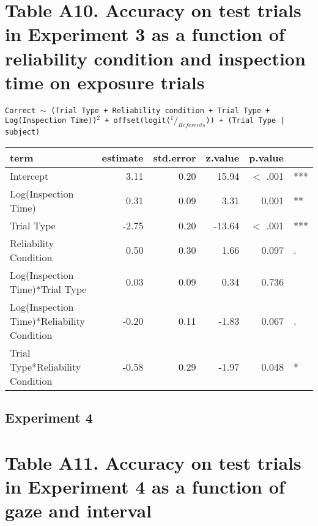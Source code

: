 \documentclass[oneside]{report}
\begin{document}
\section*{Table A10. Accuracy on test trials in Experiment 3 as a function of reliability condition and inspection time on exposure trials}

\texttt{Correct $\sim$ (Trial Type + Reliability condition + Trial Type + \\ Log(Inspection Time))$^2$ + offset(logit($^1/_{Referents}$)) + (Trial Type | subject)}
\begin{table}[h]
\centering
\begin{tabular}{lrrrrl}
 term & estimate & std.error & z.value & p.value &  \\ 
  \hline
Intercept & 3.11 & 0.20 & 15.94 & $<$ .001 & *** \\ 
  Log(Inspection Time) & 0.31 & 0.09 & 3.31 & 0.001 & ** \\ 
  Trial Type & -2.75 & 0.20 & -13.64 & $<$ .001 & *** \\ 
  Reliability Condition & 0.50 & 0.30 & 1.66 & 0.097 & . \\ 
  Log(Inspection Time)*Trial Type & 0.03 & 0.09 & 0.34 & 0.736 &  \\ 
  Log(Inspection Time)*Reliability Condition & -0.20 & 0.11 & -1.83 & 0.067 & . \\ 
  Trial Type*Reliability Condition & -0.58 & 0.29 & -1.97 & 0.048 & * \\ 
   \hline
\end{tabular}
\label{tab:e3_acc_inspect}
\end{table}
\newpage

\subsection{Experiment 4}\label{experiment-4-1}

\section*{Table A11. Accuracy on test trials in Experiment 4 as a function of gaze and interval}
\end{document}
